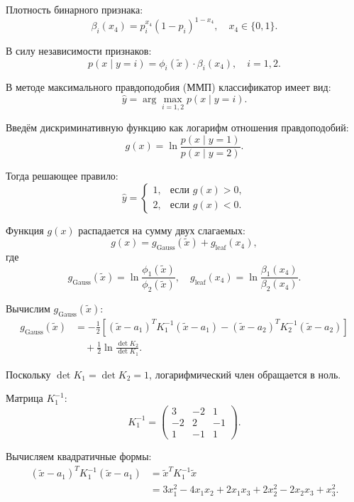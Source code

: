 \documentclass[pract]{SCWorks}
\begin{document}
    Плотность бинарного признака:
    \[
    \beta_i(x_4) = p_i^{x_4} (1 - p_i)^{1 - x_4}, \quad x_4 \in \{0, 1\}.
    \]

    В силу независимости признаков:
    \[
    p(x \mid y=i) = \phi_i(\tilde{x}) \cdot \beta_i(x_4), \quad i = 1, 2.
    \]

    В методе максимального правдоподобия (ММП) классификатор имеет вид:
    \[
    \hat{y} = \arg\max_{i=1,2} p(x \mid y=i).
    \]

    Введём дискриминативную функцию как логарифм отношения правдоподобий:
    \[
    g(x) = \ln\frac{p(x \mid y=1)}{p(x \mid y=2)}.
    \]

    Тогда решающее правило:
    \[
    \hat{y} =
    \begin{cases}
    1, & \text{если } g(x) > 0, \\
    2, & \text{если } g(x) < 0.
    \end{cases}
    \]

    Функция $g(x)$ распадается на сумму двух слагаемых:
    \[
    g(x) = g_{\text{Gauss}}(\tilde{x}) + g_{\text{leaf}}(x_4),
    \]
    где
    \[
    g_{\text{Gauss}}(\tilde{x}) = \ln\frac{\phi_1(\tilde{x})}{\phi_2(\tilde{x})}, \quad
    g_{\text{leaf}}(x_4) = \ln\frac{\beta_1(x_4)}{\beta_2(x_4)}.
    \]

    Вычислим $g_{\text{Gauss}}(\tilde{x})$:
    \[
    \begin{aligned}
    g_{\text{Gauss}}(\tilde{x}) &=
    -\frac{1}{2} \left[ (\tilde{x} - a_1)^T K_1^{-1} (\tilde{x} - a_1)
    - (\tilde{x} - a_2)^T K_2^{-1} (\tilde{x} - a_2) \right] \\
    &\quad + \frac{1}{2} \ln\frac{\det K_2}{\det K_1}.
    \end{aligned}
    \]

    Поскольку $\det K_1 = \det K_2 = 1$, логарифмический член обращается в ноль.

    Матрица $K_1^{-1}$:
    \[
    K_1^{-1} =
    \begin{pmatrix}
    3 & -2 & 1 \\
    -2 & 2 & -1 \\
    1 & -1 & 1
    \end{pmatrix}.
    \]

    Вычисляем квадратичные формы:
    \[
    \begin{aligned}
    (\tilde{x} - a_1)^T K_1^{-1} (\tilde{x} - a_1) &=
    \tilde{x}^T K_1^{-1} \tilde{x} \\
    &= 3x_1^2 - 4x_1x_2 + 2x_1x_3 + 2x_2^2 - 2x_2x_3 + x_3^2.
    \end{aligned}
    \]
\end{document}
